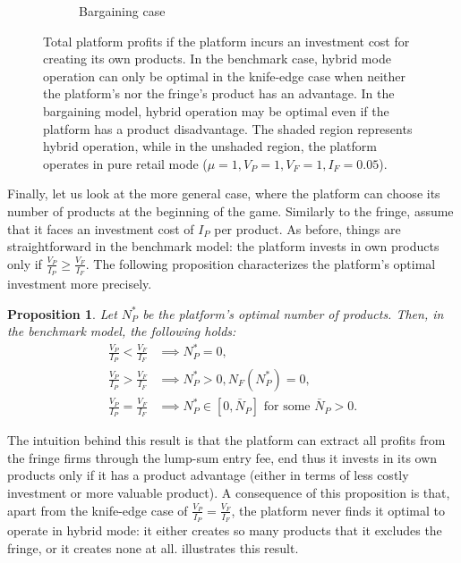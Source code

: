 \documentclass[a4paper]{article}
\newtheorem{proposition}{Proposition}
\begin{document}
\begin{figure}
\begin{subfigure}[b]{0.45\textwidth}
        \caption{Bargaining case}
        \label{fig:optimal_n_p_bargaining}
    \end{subfigure}
    \caption{Total platform profits if the platform incurs an investment cost for creating its own products. In the benchmark case, hybrid mode operation can only be optimal in the knife-edge case when neither the platform's nor the fringe's product has an advantage. In the bargaining model, hybrid operation may be optimal even if the platform has a product disadvantage. The shaded region represents hybrid operation, while in the unshaded region, the platform operates in pure retail mode ($\mu = 1, V_P = 1, V_F = 1, I_F = 0.05$).}
    \label{fig:optimal_n_p}
\end{figure}


Finally, let us look at the more general case, where the platform can choose its number of products at the beginning of the game.
Similarly to the fringe, assume that it faces an investment cost of $I_P$ per product.
As before, things are straightforward in the benchmark model: the platform invests in own products only if $\frac{V_P}{I_P} \geq \frac{V_F}{I_F}$.
The following proposition characterizes the platform's optimal investment more precisely.
\begin{proposition}
    \label{prop:optimal_n_p_benchmark}
    Let $N_P^*$ be the platform's optimal number of products.
    Then, in the benchmark model, the following holds:
    \begin{align*}
        \frac{V_P}{I_P} < \frac{V_F}{I_F} &\implies N_P^* = 0, \\
        \frac{V_P}{I_P} > \frac{V_F}{I_F} &\implies N_P^* > 0, N_F(N_P^*) = 0, \\
        \frac{V_P}{I_P} = \frac{V_F}{I_F} &\implies N_P^* \in [0, \bar{N}_P] \text{ for some } \bar{N}_P > 0.
    \end{align*}
\end{proposition}

The intuition behind this result is that the platform can extract all profits from the fringe firms through the lump-sum entry fee, end thus it invests in its own products only if it has a product advantage (either in terms of less costly investment or more valuable product).
A consequence of this proposition is that, apart from the knife-edge case of $\frac{V_P}{I_P} = \frac{V_F}{I_F}$, the platform never finds it optimal to operate in hybrid mode: it either creates so many products that it excludes the fringe, or it creates none at all.
 illustrates this result.
\end{document}
